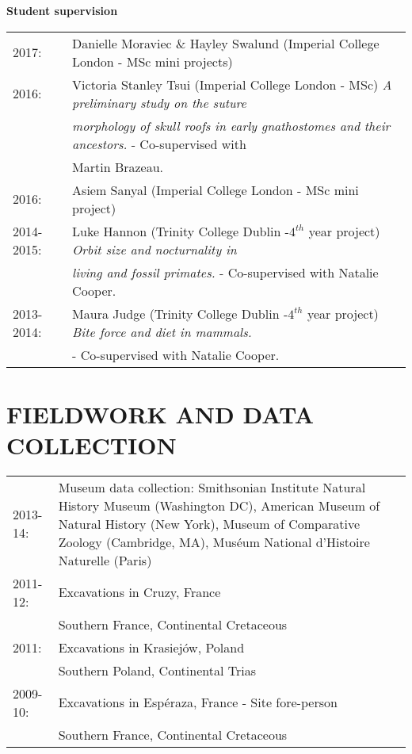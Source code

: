 \documentclass[10pt,a4paper]{article}
\begin{document}
{\bigskip

\raggedright\textbf{Student supervision}\\[1.5ex]
\begin{tabular}{ll}
2017: & Danielle Moraviec \& Hayley Swalund (Imperial College London - MSc mini projects)\\
2016: & Victoria Stanley Tsui (Imperial College London - MSc) \textit{A preliminary study on the suture}\\
& \textit{morphology of skull roofs in early gnathostomes and their ancestors.} - Co-supervised with\\
& Martin Brazeau.\\
2016: & Asiem Sanyal (Imperial College London - MSc mini project)\\
2014-2015: & Luke Hannon (Trinity College Dublin -$4^{th}$ year project) \textit{Orbit size and nocturnality in}\\
& \textit{living and fossil primates.} - Co-supervised with Natalie Cooper.\\
2013-2014: & Maura Judge (Trinity College Dublin -$4^{th}$ year project) \textit{Bite force and diet in mammals.}\\
&  - Co-supervised with Natalie Cooper.\\
\end{tabular}
\bigskip

\section{FIELDWORK AND DATA COLLECTION}
\begin{tabular}{lp{14cm}}
2013-14: & Museum data collection: Smithsonian Institute Natural History Museum (Washington DC), American Museum of Natural History (New York), Museum of Comparative Zoology (Cambridge, MA), Mus\'{e}um National d'Histoire Naturelle (Paris) \\
2011-12: & Excavations in Cruzy, France \\
& Southern France, Continental Cretaceous\\
2011: & Excavations in Krasiej\'{o}w, Poland\\
& Southern Poland, Continental Trias\\
2009-10: & Excavations in Esp\'{e}raza, France - Site fore-person\\
& Southern France, Continental Cretaceous\\
\end{tabular}
\bigskip

}
\end{document}
